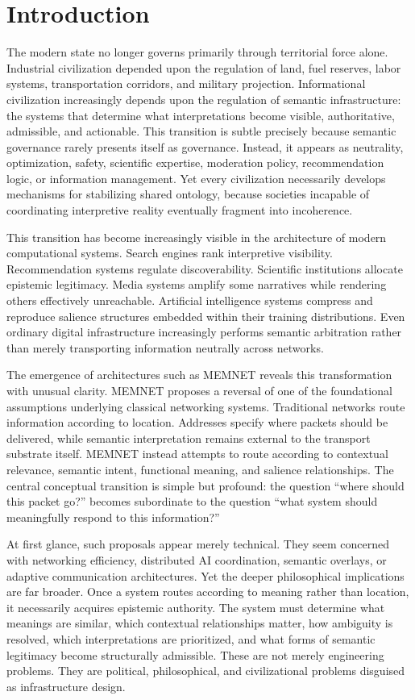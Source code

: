 \documentclass[11pt,a4paper]{article}
\begin{document}
\section{Introduction}

The modern state no longer governs primarily through territorial force alone. Industrial civilization depended upon the regulation of land, fuel reserves, labor systems, transportation corridors, and military projection. Informational civilization increasingly depends upon the regulation of semantic infrastructure: the systems that determine what interpretations become visible, authoritative, admissible, and actionable. This transition is subtle precisely because semantic governance rarely presents itself as governance. Instead, it appears as neutrality, optimization, safety, scientific expertise, moderation policy, recommendation logic, or information management. Yet every civilization necessarily develops mechanisms for stabilizing shared ontology, because societies incapable of coordinating interpretive reality eventually fragment into incoherence.

This transition has become increasingly visible in the architecture of modern computational systems. Search engines rank interpretive visibility. Recommendation systems regulate discoverability. Scientific institutions allocate epistemic legitimacy. Media systems amplify some narratives while rendering others effectively unreachable. Artificial intelligence systems compress and reproduce salience structures embedded within their training distributions. Even ordinary digital infrastructure increasingly performs semantic arbitration rather than merely transporting information neutrally across networks.

The emergence of architectures such as MEMNET reveals this transformation with unusual clarity. MEMNET proposes a reversal of one of the foundational assumptions underlying classical networking systems. Traditional networks route information according to location. Addresses specify where packets should be delivered, while semantic interpretation remains external to the transport substrate itself. MEMNET instead attempts to route according to contextual relevance, semantic intent, functional meaning, and salience relationships. The central conceptual transition is simple but profound: the question ``where should this packet go?'' becomes subordinate to the question ``what system should meaningfully respond to this information?''

At first glance, such proposals appear merely technical. They seem concerned with networking efficiency, distributed AI coordination, semantic overlays, or adaptive communication architectures. Yet the deeper philosophical implications are far broader. Once a system routes according to meaning rather than location, it necessarily acquires epistemic authority. The system must determine what meanings are similar, which contextual relationships matter, how ambiguity is resolved, which interpretations are prioritized, and what forms of semantic legitimacy become structurally admissible. These are not merely engineering problems. They are political, philosophical, and civilizational problems disguised as infrastructure design.
\end{document}
